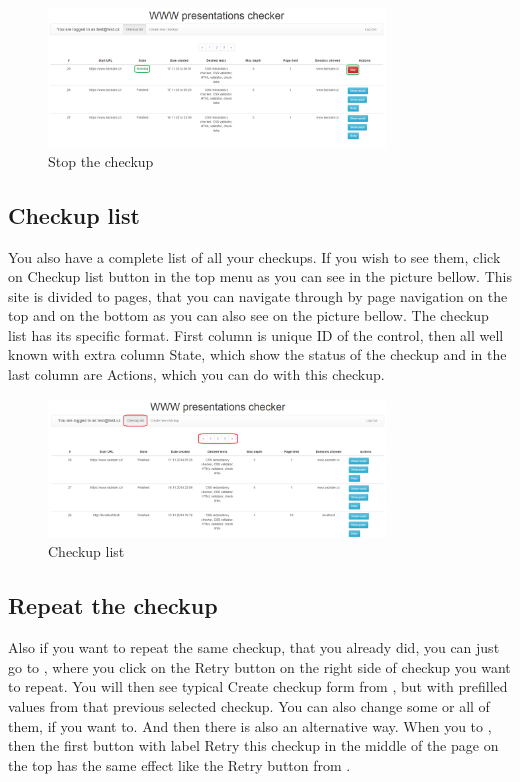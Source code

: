 \documentclass[12pt,a4paper]{article}
\begin{document}
\begin{figure}[H]
    \centering
    \includegraphics[width=0.8\textwidth]{pictures/stop.png}
		\caption{Stop the checkup}
		\label{fig:stop}
\end{figure}

\subsection{Checkup list} \label{list}
You also have a complete list of all your checkups. If you wish to see them, click on Checkup list button in the top menu as you can see in the picture bellow. This site is divided to pages, that you can navigate through by page navigation on the top and on the bottom as you can also see on the picture bellow. The checkup list has its specific format. First column is unique ID of the control, then all well known  with extra column State, which show the status of the checkup and in the last column are Actions, which you can do with this checkup.

\begin{figure}[H]
    \centering
    \includegraphics[width=0.8\textwidth]{pictures/list.png}
		\caption{Checkup list}
		\label{fig:list}
\end{figure}

\subsection{Repeat the checkup}
Also if you want to repeat the same checkup, that you already did, you can just go to , where you click on the Retry button on the right side of checkup you want to repeat. You will then see typical Create checkup form from , but with prefilled values from that previous selected checkup. You can also change some or all of them, if you want to. And then there is also an alternative way. When you to \label{messages}, then the first button with label Retry this checkup in the middle of the page on the top has the same effect like the Retry button from \label{results}.
\end{document}
